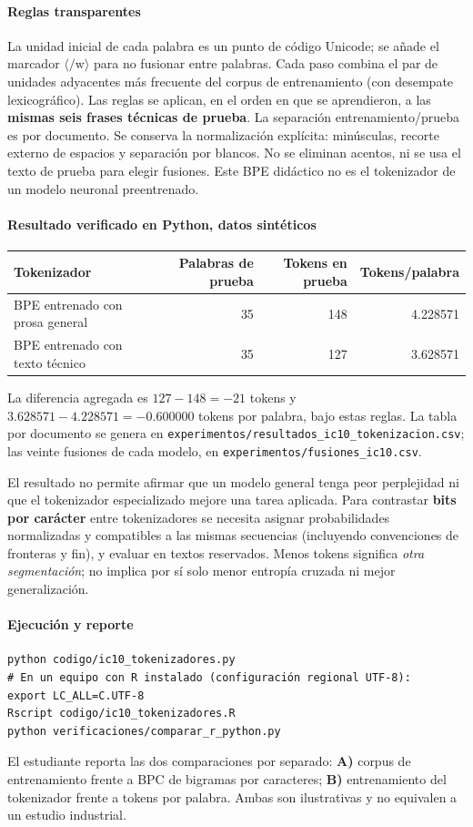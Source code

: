 \paragraph{Reglas transparentes}
La unidad inicial de cada palabra es un punto de código Unicode; se añade
el marcador $\langle/\mathrm w\rangle$ para no fusionar entre palabras. Cada paso combina
el par de unidades adyacentes más frecuente del corpus de entrenamiento
(con desempate lexicográfico). Las reglas se aplican, en el orden en que
se aprendieron, a las \textbf{mismas seis frases técnicas de prueba}.
La separación entrenamiento/prueba es por documento. Se conserva la
normalización explícita: minúsculas, recorte externo de espacios y
separación por blancos. No se eliminan acentos, ni se usa el texto de
prueba para elegir fusiones. Este BPE didáctico no es el tokenizador de
un modelo neuronal preentrenado.
\paragraph{Resultado verificado en Python, datos sintéticos}
\begin{center}\begin{tabular}{lrrr}\toprule
Tokenizador & Palabras de prueba & Tokens en prueba & Tokens/palabra\\\midrule
BPE entrenado con prosa general & 35 & 148 & 4.228571\\
BPE entrenado con texto técnico & 35 & 127 & 3.628571\\\bottomrule
\end{tabular}\end{center}
La diferencia agregada es $127-148=-21$ tokens y
$3.628571-4.228571=-0.600000$ tokens por palabra, bajo estas reglas.
La tabla por documento se genera en
\nolinkurl{experimentos/resultados_ic10_tokenizacion.csv}; las veinte
fusiones de cada modelo, en \nolinkurl{experimentos/fusiones_ic10.csv}.
\begin{verificacion}
El resultado no permite afirmar que un modelo general tenga peor
perplejidad ni que el tokenizador especializado mejore una tarea aplicada.
Para contrastar \textbf{bits por carácter} entre tokenizadores se
necesita asignar probabilidades normalizadas y compatibles a las mismas
secuencias (incluyendo convenciones de fronteras y fin), y evaluar en
textos reservados. Menos tokens significa \emph{otra segmentación}; no
implica por sí solo menor entropía cruzada ni mejor generalización.
\end{verificacion}
\paragraph{Ejecución y reporte}
\begin{verbatim}
python codigo/ic10_tokenizadores.py
# En un equipo con R instalado (configuración regional UTF-8):
export LC_ALL=C.UTF-8
Rscript codigo/ic10_tokenizadores.R
python verificaciones/comparar_r_python.py
\end{verbatim}
El estudiante reporta las dos comparaciones por separado:
\textbf{A)} corpus de entrenamiento frente a BPC de bigramas por
caracteres; \textbf{B)} entrenamiento del tokenizador frente a tokens por
palabra. Ambas son ilustrativas y no equivalen a un estudio industrial.

